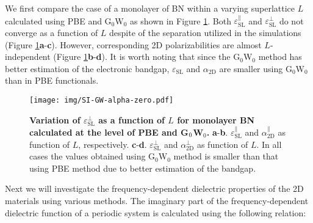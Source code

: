 \documentclass[journal=ancac3,email=true,hyperref=true,keywords=false]{achemso}
\begin{document}

We first compare the case of a monolayer of BN within a varying
superlattice $L$ calculated using PBE and G$_{0}$W$_{0}$ as shown in
Figure \ref{fig:GW-PBE-alpha}.  Both
$\varepsilon_{\mathrm{SL}}^{\parallel}$ and
$\varepsilon_{\mathrm{SL}}^{\perp}$ do not converge as a function of
$L$ despite of the separation utilized in the simulations (Figure
\ref{fig:GW-PBE-alpha}{\bf a}-{\bf c}). However, corresponding 2D
polarizabilities are almost $L$-independent (Figure
\ref{fig:GW-PBE-alpha}{\bf b}-{\bf d}). It is worth noting that since
the G$_{0}$W$_{0}$ method has better estimation of the electronic bandgap,
$\varepsilon_{\mathrm{SL}}$ and $\alpha_{\mathrm{2D}}$ are smaller
using G$_{0}$W$_{0}$ than in PBE functionals.
\begin{figure}[htbp]
  \centering
 \texttt{[image: img/SI-GW-alpha-zero.pdf]}
 \caption{{\bf Variation of 
   $\varepsilon^{\perp}_{\mathrm{SL}}$ as a function of $L$ for
   monolayer BN calculated at the level of PBE and G$_{\rm 0}$W$_{0}$.}
   \textbf{a}-{\bf b}. $\varepsilon_{\mathrm{SL}}^{\parallel}$ and $\alpha_{\mathrm{2D}}^{\parallel}$ as function of $L$, respectively.    
  \textbf{c}-{\bf d}. $\varepsilon_{\mathrm{SL}}^{\perp}$ and 
  $\alpha_{\mathrm{2D}}^{\perp}$ as
   function of $L$. 
   In all cases the values obtained using
   G$_{0}$W$_{0}$ method is smaller than that using PBE method due to
   better estimation of the bandgap.}
  \label{fig:GW-PBE-alpha}
\end{figure}

Next we will investigate the frequency-dependent dielectric properties of the 2D materials using various methods. The imaginary part of the frequency-dependent dielectric function of a periodic system is calculated using the following relation:
\end{document}
